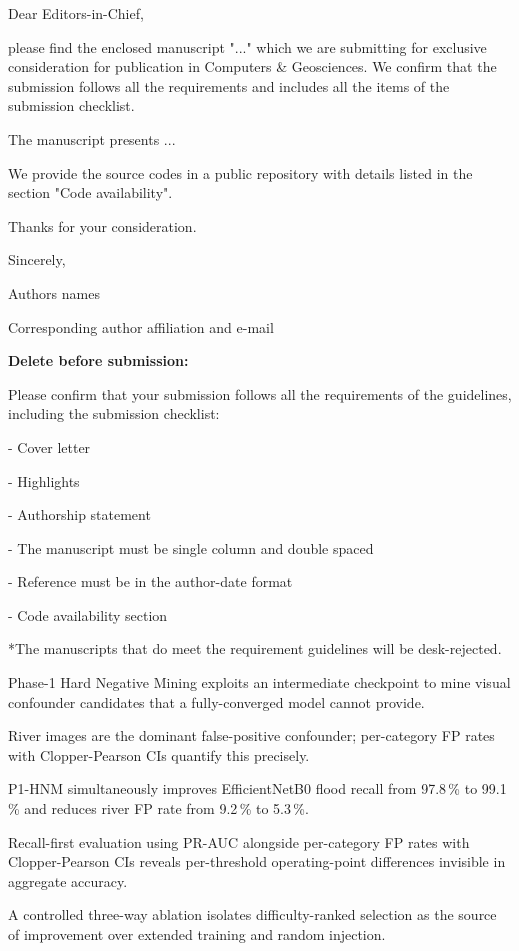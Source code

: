 \documentclass[a4paper,fleqn]{cas-sc}
\begin{document}
\begin{coverletter}

Dear Editors-in-Chief,
\newline
 
please find the enclosed manuscript "..." which we are submitting for exclusive consideration for publication in Computers \& Geosciences. We confirm that the submission follows all the requirements and includes all the items of the submission checklist.  
\newline
 
The manuscript presents ... 
\newline

We provide the source codes in a public repository with details listed in the section "Code availability".
\newline

Thanks for your consideration. 
\newline

Sincerely,
\newline

Authors names

Corresponding author affiliation and e-mail
\newline

\textbf{Delete before submission:}

Please confirm that your submission follows all the requirements of the guidelines, including the submission checklist:

- Cover letter

- Highlights

- Authorship statement

- The manuscript must be single column and double spaced

- Reference must be in the author-date format

- Code availability section 

*The manuscripts that do meet the requirement guidelines will be desk-rejected.



\end{coverletter}

 
\begin{highlights}
\item Phase-1 Hard Negative Mining exploits an intermediate checkpoint to mine visual confounder candidates that a fully-converged model cannot provide.
\item River images are the dominant false-positive confounder; per-category FP rates with Clopper-Pearson CIs quantify this precisely.
\item P1-HNM simultaneously improves EfficientNetB0 flood recall from 97.8\,\% to 99.1\,\% and reduces river FP rate from 9.2\,\% to 5.3\,\%.
\item Recall-first evaluation using PR-AUC alongside per-category FP rates with Clopper-Pearson CIs reveals per-threshold operating-point differences invisible in aggregate accuracy.
\item A controlled three-way ablation isolates difficulty-ranked selection as the source of improvement over extended training and random injection.
\end{highlights}
\end{document}
